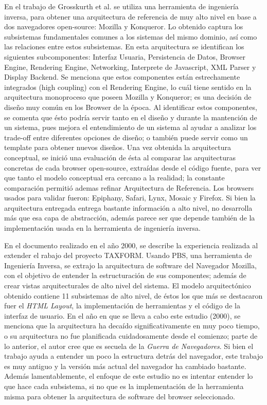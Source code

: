 En el trabajo de Grosskurth et al. \cite{2005-grosskurth-browser-refarch, preprint-grosskurth-browser-archevol} se utiliza una herramienta de ingeniería inversa, para obtener una arquitectura de referencia de muy alto nivel en base a dos navegadores open-source: Mozilla y Konqueror. Lo obtenido captura los subsistemas fundamentales comunes a los sistemas del mismo dominio, así como las relaciones entre estos subsistemas. En esta arquitectura se identifican los siguientes subcomponentes: Interfaz Usuaria, Persistencia de Datos, Browser Engine, Rendering Engine, Networking, Interprete de Javascript, XML Parser y Display Backend. Se menciona que estos componentes están estrechamente integrados (high coupling) con el Rendering Engine, lo cuál tiene sentido en la arquitectura monoproceso que poseen Mozilla y Konqueror; es una decisión de diseño muy común en los Browser de la época. Al identificar estos componentes, se comenta que ésto podría servir tanto en el diseño y durante la mantención de un sistema, pues mejora el entendimiento de un sistema al ayudar a analizar los trade-off entre diferentes opciones de diseño; o también puede servir como un template para obtener nuevos diseños. Una vez obtenida la arquitectura conceptual, se inició una evaluación de ésta al comparar las arquitecturas concretas de cada browser open-source, extraídas desde el código fuente, para ver que tanto el modelo conceptual era cercano a la realidad; la constante comparación permitió ademas refinar Arquitectura de Referencia. Los browsers usados para validar fueron: Epiphany, Safari, Lynx, Mosaic y Firefox. Si bien la arquitectura entregada entrega bastante información a alto nivel, no desarrolla más que esa capa de abstracción, además parece ser que depende también de la implementación usada en la herramienta de ingeniería inversa. 


En el documento \cite{Godfrey2000} realizado en el año 2000, se describe la experiencia realizada al extender el rabajo del proyecto TAXFORM. Usando PBS, una herramienta de Ingeniería Inversa, se extrajo la arquitectura de software del Navegador Mozilla, con el objetivo de entender la estructuración de sus componentes; además de crear vistas arquitecturales de alto nivel del sistema. El modelo arquitectónico obtenido contiene 11 subsistemas de alto nivel, de éstos los que más se destacaron fuer el \textit{HTML Layout}, la implementación de herramientas y el código de la interfaz de usuario. En el año en que se lleva a cabo este estudio (2000), se menciona que la arquitectura ha decaído significativamente en muy poco tiempo, o su arquitectura no fue planificada cuidadosamente desde el comienzo; parte de lo anterior, el autor cree que es secuela de la \textit{Guerra de Navegadores}. Si bien el trabajo ayuda a entender un poco la estructura detrás del navegador, este trabajo es muy antiguo y la versión más actual del navegador ha cambiado bastante. Además lamentablemente, el enfoque de este estudio no es intentar entender lo que hace cada subsistema, si no que es la implementación de la herramienta misma para obtener la arquitectura de software del browser seleccionado.

